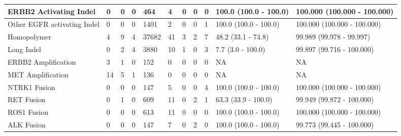 \begin{tabular}{|l|l|l|l|l|l|l|l|l|l|l|}
ERBB2 Activating Indel      &      0 &      0 &      0 &    464 &      4 &      0 &      0 &      0 &  100.0 (100.0 - 100.0) &  100.000 (100.000 - 100.000) \\ \hline
Other EGFR activating Indel &      0 &      0 &      0 &   1401 &      2 &      0 &      0 &      1 &  100.0 (100.0 - 100.0) &  100.000 (100.000 - 100.000) \\ \hline
Homopolymer                 &      4 &      9 &      4 &  37682 &     41 &      3 &      2 &      7 &     48.2 (33.1 - 74.8) &     99.989 (99.978 - 99.997) \\ \hline
Long Indel                  &      0 &      2 &      4 &   3880 &     10 &      1 &      0 &      3 &      7.7 (3.0 - 100.0) &    99.897 (99.716 - 100.000) \\ \hline
ERBB2 Amplification         &      3 &      1 &      0 &    152 &      0 &      0 &      0 &      0 &                     NA &                           NA \\ \hline
MET Amplification           &     14 &      5 &      1 &    136 &      0 &      0 &      0 &      0 &                     NA &                           NA \\ \hline
NTRK1 Fusion                &      0 &      0 &      0 &    147 &      5 &      0 &      0 &      4 &  100.0 (100.0 - 100.0) &  100.000 (100.000 - 100.000) \\ \hline
RET Fusion                  &      0 &      1 &      0 &    609 &     11 &      0 &      2 &      1 &    63.3 (33.9 - 100.0) &    99.949 (99.872 - 100.000) \\ \hline
ROS1 Fusion                 &      0 &      0 &      0 &    613 &     11 &      0 &      0 &      0 &  100.0 (100.0 - 100.0) &  100.000 (100.000 - 100.000) \\ \hline
ALK Fusion                  &      0 &      0 &      0 &    147 &      7 &      0 &      2 &      0 &  100.0 (100.0 - 100.0) &    99.773 (99.445 - 100.000) \\ \hline
\end{tabular}